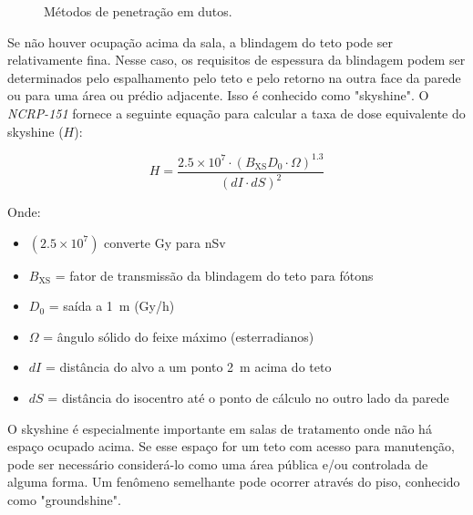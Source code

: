 \documentclass[11pt,a4paper]{article}
\begin{document}
	\begin{figure}[!h]
		\centering
		\caption{Métodos de penetração em dutos.}
		\label{fig:prductos}
	\end{figure}

	Se não houver ocupação acima da sala, a blindagem do teto pode ser relativamente fina. Nesse caso, os requisitos de espessura da blindagem podem ser determinados pelo espalhamento pelo teto e pelo retorno na outra face da parede ou para uma área ou prédio adjacente. Isso é conhecido como "skyshine". O \textit{NCRP-151} fornece a seguinte equação para calcular a taxa de dose equivalente do skyshine ($H$):

	\begin{equation}
		H = \frac{2.5 \times 10^7  \cdot ( B_{\text{XS}} D_0 \cdot \Omega)^{1.3}}{(dI \cdot dS)^2 }
	\end{equation}

	Onde:
	\begin{itemize}
	\item $(2.5 \times 10^7)$ converte \si{\gray} para \si{\nano\sievert}
	\item $B_{\text{XS}}$ = fator de transmissão da blindagem do teto para fótons
	\item $D_0$ = saída a \SI{1}{\meter} (\si{\gray}/\si{\hour})
	\item $\Omega$ = ângulo sólido do feixe máximo (esterradianos)
	\item $dI$ = distância do alvo a um ponto \SI{2}{\meter} acima do teto
	\item $dS$ = distância do isocentro até o ponto de cálculo no outro lado da parede
	\end{itemize}

	O skyshine é especialmente importante em salas de tratamento onde não há espaço ocupado acima. Se esse espaço for um teto com acesso para manutenção, pode ser necessário considerá-lo como uma área pública e/ou controlada de alguma forma. Um fenômeno semelhante pode ocorrer através do piso, conhecido como "groundshine".
\end{document}
